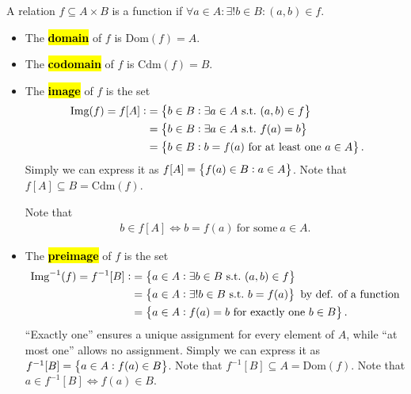 \documentclass[11pt,openany]{article}
\begin{document}
\begin{remark*}
	A relation $f\subseteq A\times B$ is a function if $\boxed{\forall a\in A:\exists! b\in B:(a,b)\in f.}$
	\begin{itemize}
		\item The \hl{\textbf{domain}} of $f$ is $\text{Dom}(f)=A$.
		\item The \hl{\textbf{codomain}} of $f$ is $\text{Cdm}(f)=B$.
		\item The \hl{\textbf{image}} of $f$ is the set \begin{align*}\
			\img{f}=f[A]:&=\set{b\in B:\exists a \in A\ \text{s.t.}\ (a,b)\in f}\\
			&=\set{b\in B:\exists a \in A\ \text{s.t.}\ f(a)=b}\\
			&=\set{b\in B: b = f(a)\ \text{for at least one}\ a\in A}.
		\end{align*} Simply we can express it as $f[A]=\set{f(a)\in B:a\in A}$. Note that $f[A]\subseteq B=\text{Cdm}(f)$. 
	
		Note that \begin{align*}
			b\in f[A]\iff b=f(a)\ \text{for some}\ a\in A.
		\end{align*}
		\item The \hl{\textbf{preimage}} of $f$ is the set \begin{align*}
			\preimg{f}=f^{-1}[B]:&=\set{a\in A:\exists b \in B\ \text{s.t.}\ (a,b)\in f}\\
			&=\set{a\in A:\exists! b \in B\ \text{s.t.}\ b=f(a)}\ \text{by def. of a function}\\
			&=\set{a\in A:f(a)=b\ \text{for exactly one}\ b\in B}.
		\end{align*} ``Exactly one'' ensures a unique assignment for every element of $A$, while ``at most one'' allows no assignment. Simply we can express it as $f^{-1}[B]=\set{a\in A:f(a)\in B}$. Note that $f^{-1}[B]\subseteq A=\text{Dom}(f)$.
		Note that $a\in f^{-1}[B]\iff f(a)\in B.$
	\end{itemize}
\end{remark*}
\end{document}
